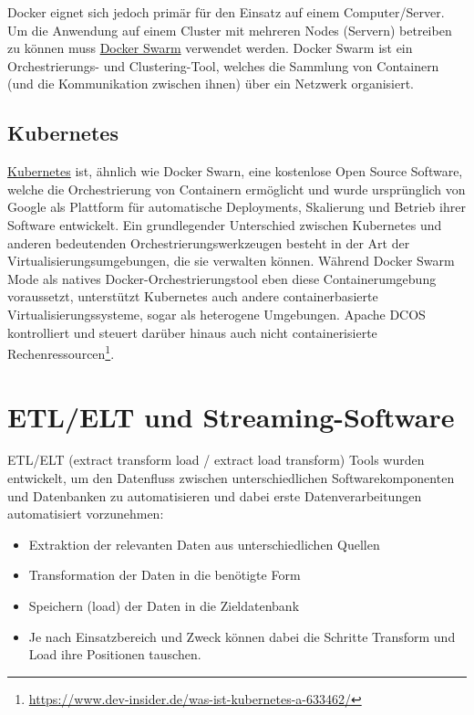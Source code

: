 Docker eignet sich jedoch prim{\"a}r f{\"u}r den Einsatz auf einem Computer/Server. Um die Anwendung auf einem Cluster mit mehreren Nodes (Servern) betreiben zu k{\"o}nnen muss \href{https://docs.docker.com/engine/swarm/}{ Docker Swarm} verwendet werden. Docker Swarm ist ein Orchestrierungs- und Clustering-Tool, welches die Sammlung von Containern (und die Kommunikation zwischen ihnen) {\"u}ber ein Netzwerk organisiert.

\subsection{Kubernetes}
\label{sec:Kubernetes}
\href{https://kubernetes.io}{Kubernetes} ist, {\"a}hnlich wie Docker Swarn, eine kostenlose Open Source Software, welche die Orchestrierung von Containern erm{\"o}glicht und wurde urspr{\"u}nglich von Google als Plattform f{\"u}r automatische Deployments, Skalierung und Betrieb ihrer Software entwickelt. Ein grundlegender Unterschied zwischen Kubernetes und anderen bedeutenden Orchestrierungswerkzeugen besteht in der Art der Virtualisierungsumgebungen, die sie verwalten k{\"o}nnen. W{\"a}hrend Docker Swarm Mode als natives Docker-Orchestrierungstool eben diese Containerumgebung voraussetzt, unterst{\"u}tzt Kubernetes auch andere containerbasierte Virtualisierungssysteme, sogar als heterogene Umgebungen. Apache DCOS kontrolliert und steuert dar{\"u}ber hinaus auch nicht containerisierte Rechenressourcen\footnote{\label{foot:2} \url{https://www.dev-insider.de/was-ist-kubernetes-a-633462/}}.


\section{ETL/ELT und Streaming-Software}
\label{sec:streaming}

ETL/ELT (extract transform load / extract load transform) Tools wurden entwickelt, um den Datenfluss zwischen unterschiedlichen Softwarekomponenten und Datenbanken zu automatisieren und dabei erste Datenverarbeitungen automatisiert vorzunehmen:

\begin{itemize}
  \item Extraktion der relevanten Daten aus unterschiedlichen Quellen
  \item Transformation der Daten in die ben{\"o}tigte Form
  \item Speichern (load) der Daten in die Zieldatenbank
  \item Je nach Einsatzbereich und Zweck k{\"o}nnen dabei die Schritte Transform und Load ihre Positionen tauschen.
\end{itemize}

